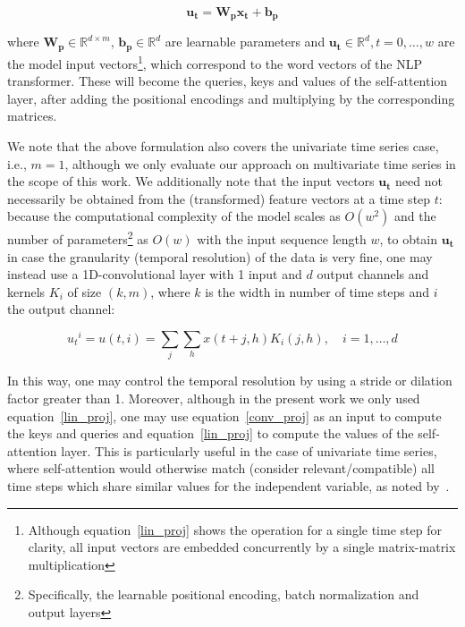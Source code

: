 \documentclass{article} \usepackage{iclr2021_conference,times}
\def\eqref#1{equation~\ref{#1}}
\begin{document}
\begin{equation}
    \mathbf{u_t} = \mathbf{W_p}\mathbf{x_t} + \mathbf{b_p} \label{lin_proj}
\end{equation}

\noindent where $\mathbf{W_p} \in \mathbb{R}^{d\times m}$, $\mathbf{b_p}  \in \mathbb{R}^{d}$ are learnable parameters and $\mathbf{u_t}  \in \mathbb{R}^{d}, t=0,\dots, w$ are the model input vectors\footnote{Although \eqref{lin_proj} shows the operation for a single time step for clarity, all input vectors are embedded concurrently by a single matrix-matrix multiplication}, which correspond to the word vectors of the NLP transformer.
These will become the queries, keys and values of the self-attention layer, after adding the positional encodings and multiplying by the corresponding matrices. 

We note that the above formulation also covers the univariate time series case, i.e., $m=1$, although we only evaluate our approach on multivariate time series in the scope of this work. We additionally note that the input vectors $\mathbf{u_t}$ need not necessarily be obtained from the (transformed) feature vectors at a time step $t$: because the computational complexity of the model scales as $O(w^2)$ and the number of parameters\footnote{Specifically, the learnable positional encoding, batch normalization and output layers} as $O(w)$ with the input sequence length $w$,  to obtain $\mathbf{u_t}$ in case the granularity (temporal resolution) of the data is very fine, one may instead use a 1D-convolutional layer with 1 input and $d$ output channels and kernels $K_i$ of size $(k, m)$, where $k$ is the width in number of time steps and $i$ the output channel:

\begin{equation}
    {u_t}^i = u(t, i) = \sum_j \sum_h x(t+j, h) K_i(j, h), \quad i=1,\dots, d \label{conv_proj}
\end{equation}

In this way, one may control the temporal resolution by using a stride or dilation factor greater than 1. Moreover, although in the present work we only used \eqref{lin_proj}, one may use \eqref{conv_proj} as an input to compute the keys and queries and \eqref{lin_proj} to compute the values of the self-attention layer. This is particularly useful in the case of univariate time series, where self-attention would otherwise match (consider relevant/compatible) all time steps which share similar values for the independent variable, as noted by~\citet{li2019enhancing}.
\end{document}
